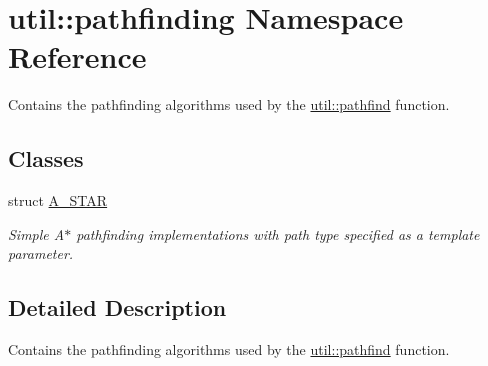 \hypertarget{namespaceutil_1_1pathfinding}{}\section{util\+:\+:pathfinding Namespace Reference}
\label{namespaceutil_1_1pathfinding}


Contains the pathfinding algorithms used by the \hyperlink{namespaceutil_a1d8b1dc5bfaf22eb62b03173a6ff9b56}{util\+::pathfind} function.  


\subsection*{Classes}
\begin{DoxyCompactItemize}
\item 
struct \hyperlink{structutil_1_1pathfinding_1_1_a___s_t_a_r}{A\+\_\+\+S\+T\+AR}
\begin{DoxyCompactList}\small\item\em Simple A$\ast$ pathfinding implementations with path type specified as a template parameter. \end{DoxyCompactList}\end{DoxyCompactItemize}


\subsection{Detailed Description}
Contains the pathfinding algorithms used by the \hyperlink{namespaceutil_a1d8b1dc5bfaf22eb62b03173a6ff9b56}{util\+::pathfind} function. 